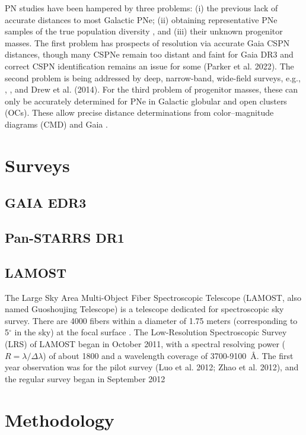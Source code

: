 \documentclass[twocolumn]{article}
\begin{document}
PN studies have been hampered by three problems:
(i) the previous lack of accurate distances to most Galactic
PNe; (ii) obtaining representative PNe samples of the true
population diversity \citep{Parker:2022}, and (iii) their unknown
progenitor masses. The first problem has prospects of
resolution via accurate Gaia CSPN distances, though many
CSPNe remain too distant and faint for Gaia DR3 and correct
CSPN identification remains an issue for some (Parker et al.
2022). The second problem is being addressed by deep, narrow-band,
wide-field surveys, e.g., \citet{Parker:2005},
\citet{Drew:2005}, and Drew et al. (2014). For the third problem
of progenitor masses, these can only
be accurately determined for PNe in Galactic globular and
open clusters (OCs). These allow precise distance determinations
from color–magnitude diagrams (CMD) and Gaia \citep{Fragkou:2022}.

\section{Surveys}
\label{sec:surveys}

\subsection{GAIA EDR3}
\label{sec:gaia}

\subsection{Pan-STARRS DR1}
\label{sec:PS1}

\subsection{LAMOST}
\label{sec:lamost}

The Large Sky Area Multi-Object Fiber Spectroscopic Telescope
(LAMOST, also named Guoshoujing Telescope) is a
telescope dedicated for spectroscopic sky survey.
There are 4000 fibers within a diameter of 1.75 meters (corresponding
to 5$^{\circ}$ in the sky) at the focal surface \citep{Cui:2012}.
The Low-Resolution Spectroscopic Survey (LRS) of LAMOST
began in October 2011, with a spectral resolving power ($R = \lambda/\Delta\lambda$)
of about 1800 and a wavelength coverage of
3700-9100~\AA \citep{Zhao:2012}. The first year observation was
for the pilot survey (Luo et al. 2012; Zhao et al. 2012),
and the regular survey began in September 2012


\section{Methodology}
\label{sec:metho}
\end{document}
